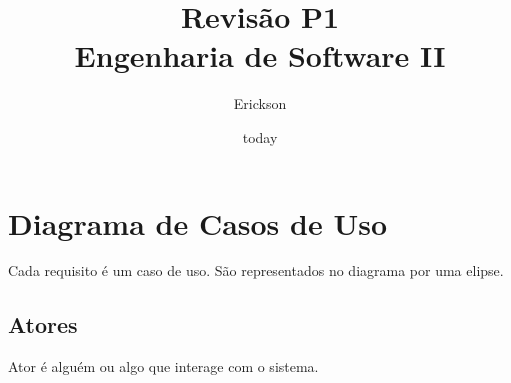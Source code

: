 \documentclass[ ]{article}
\title{Revisão P1\\Engenharia de Software II}
\author{Erickson}
\date{today}
\begin{document}
	\maketitle
	\newpage
	
	\section{Diagrama de Casos de Uso}
		Cada requisito é um caso de uso. São representados no diagrama por uma elipse.
		\subsection{Atores}
				Ator é alguém ou algo que interage com o sistema.
\end{document}
